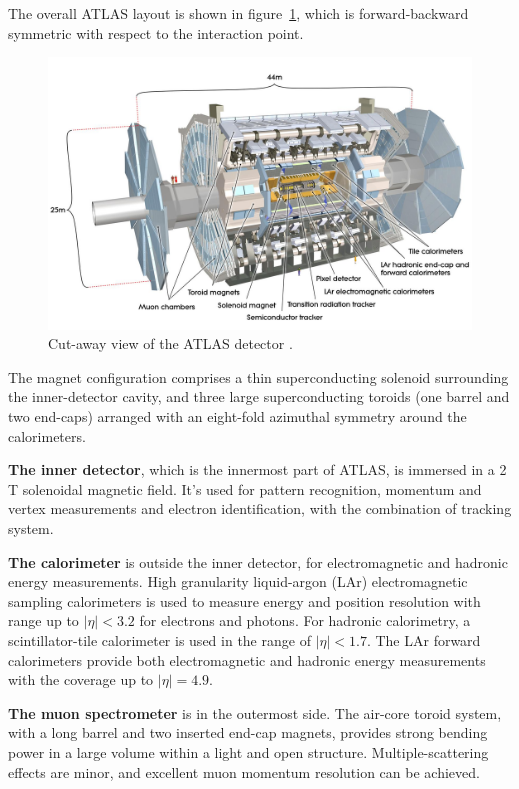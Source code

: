 The overall ATLAS layout is shown in figure~\ref{fig:atlas_layout}, which is forward-backward symmetric with respect to the interaction point.
\begin{figure}[!htb]
  \centering
  \includegraphics[width=1.0\textwidth]{figures/Detector/atlas_layout.jpg}
  \caption{Cut-away view of the ATLAS detector \cite{Pequenao:1095924}.}
  \label{fig:atlas_layout}
\end{figure}
The magnet configuration comprises a thin superconducting solenoid surrounding the inner-detector cavity, 
and three large superconducting toroids (one barrel and two end-caps) arranged with an eight-fold azimuthal symmetry around the calorimeters.

\textbf{The inner detector}, which is the innermost part of ATLAS, is immersed in a 2 T solenoidal magnetic field.
It's used for pattern recognition, momentum and vertex measurements and electron identification, with the combination of tracking system.

\textbf{The calorimeter} is outside the inner detector, for electromagnetic and hadronic energy measurements.
High granularity liquid-argon (LAr) electromagnetic sampling calorimeters is used to measure energy and position resolution with range up to $|\eta| < 3.2$ for electrons and photons.
For hadronic calorimetry, a scintillator-tile calorimeter is used in the range of $|\eta| < 1.7$.
The LAr forward calorimeters provide both electromagnetic and hadronic energy measurements with the coverage up to $|\eta| = 4.9$.

\textbf{The muon spectrometer} is in the outermost side.
The air-core toroid system, with a long barrel and two inserted end-cap magnets, provides strong bending power in a large volume within a light and open structure.
Multiple-scattering effects are minor, and excellent muon momentum resolution can be achieved.
